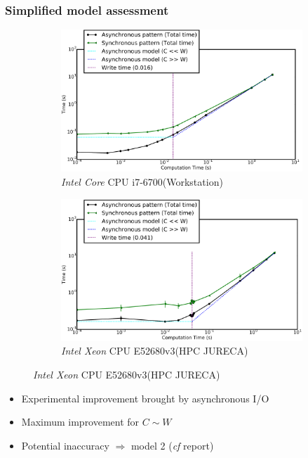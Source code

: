 \documentclass[slidestop,xcolor=dvipsnames, notes=hide]{beamer}
\newcommand{\targetPlatformHpc}				{\targetPlatformHpcProcessor\space (HPC JURECA)}
\newcommand{\targetPlatformHpcProcessor}	{\emph{Intel Xeon} CPU E52680v3}
\newcommand{\targetPlatformLaptop}			{\targetPlatformProcessor\space (Workstation)}
\newcommand{\targetPlatformProcessor}		{\emph{Intel Core} CPU i7-6700}
\newcommand{\notationIO}					{I/O}
\newcommand{\notationaio}					{asynchronous \notationIO}
\begin{document}
		\begin{frame}
			\frametitle{Simplified model assessment}
			\center
			\begin{figure}[!h]
				\centering
				\begin{subfigure}[b]{0.48\textwidth}
					\centering
					\includegraphics[width=\textwidth]{images/model0_workstation_8core_logScale.png}
					\caption[]%
					{{\small \targetPlatformLaptop}}
				\end{subfigure}
				\hfill
				\begin{subfigure}[b]{0.475\textwidth}  
					\centering 
					\includegraphics[width=\textwidth]{images/model0_hpc_2Proc_1IoDevice_logScale.png}
					\caption[]%
					{{\small \targetPlatformHpc}}
				\end{subfigure}
			\end{figure}

			\begin{block}{}
			\begin{itemize}
				\item Experimental improvement brought by \notationaio
				\item Maximum improvement for $C \sim W$
				\pause
				\item Potential inaccuracy $\Rightarrow$ model 2 (\emph{cf} report)
			\end{itemize}

			
			
			

			\end{block}
		\end{frame}
\end{document}
